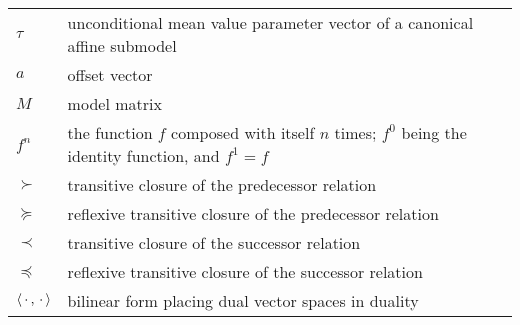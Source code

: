 \begin{raggedright}
\begin{longtable}{lp{4.4in}}
$\tau$ & unconditional mean value parameter vector of a canonical
    affine submodel \\
$a$ & offset vector \\
$M$ & model matrix \\
$f^n$ & the function $f$ composed with itself $n$ times;
    $f^0$ being the identity function, and $f^1 = f$ \\
$\succ$ & transitive closure of the predecessor relation \\
$\succeq$ & reflexive transitive closure of the predecessor relation \\
$\prec$ & transitive closure of the successor relation \\
$\preceq$ & reflexive transitive closure of the successor relation \\
$\langle \,\cdot\,, \,\cdot\, \rangle$ & bilinear form placing dual vector spaces
    in duality \\
\end{longtable}
\end{raggedright}
